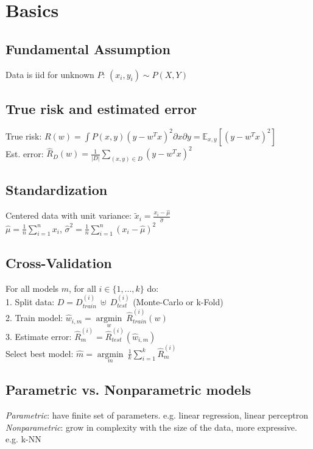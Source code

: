 
\section*{Basics}

\subsection*{Fundamental Assumption}
Data is iid for unknown $P$: $(x_i, y_i) \sim P(X,Y)$

\subsection*{True risk and estimated error}
True risk: $R(w) = \int P(x,y) (y-w^Tx)^2 \partial x \partial y = \mathbb{E}_{x,y}[(y-w^Tx)^2]$ \\
Est. error: $\hat{R}_D(w) = \frac{1}{|D|}\sum_{(x,y)\in D} (y-w^Tx)^2$

\subsection*{Standardization}
Centered data with unit variance:
$\tilde{x}_{i} = \frac{x_{i}-\hat{\mu}}{\hat{\sigma}}$\\
$\hat{\mu} = \frac{1}{n}\sum_{i=1}^n x_{i}$, $\hat{\sigma}^2 = \frac{1}{n}\sum_{i=1}^n {(x_{i}-\hat{\mu})}^2$ 

\subsection*{Cross-Validation}
For all models $m$, for all $i \in \{ 1, ..., k \}$ do:\\
1. Split data: $D = D_{train}^{(i)} ~ \uplus ~ D_{test}^{(i)} $ (Monte-Carlo or k-Fold) \\
2. Train model: $\hat{w}_{i,m} = \underset{w}{\operatorname{argmin}} ~ \hat{R}_{train}^{(i)} (w)$ \\
3. Estimate error: $\hat{R}_{m}^{(i)} = \hat{R}_{test}^{(i)} (\hat{w}_{i,m})$ \\
Select best model: $\hat{m} = \underset{m}{\operatorname{argmin}} ~ \frac{1}{k} \sum_{i=1}^{k} \hat{R}_{m}^{(i)}$

\subsection*{Parametric vs. Nonparametric models}
\emph{Parametric}: have finite set of parameters. 
e.g. linear regression, linear perceptron\\
\emph{Nonparametric}: grow in complexity with the size of the data, more expressive.
e.g. k-NN

